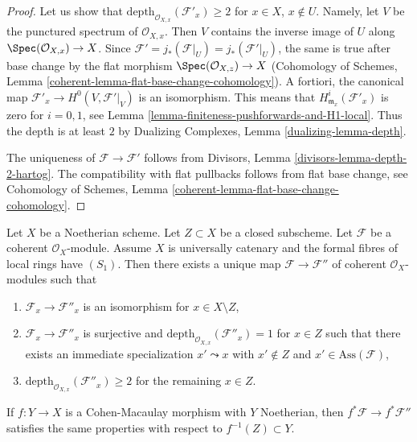 \begin{proof}
Let us show that $\text{depth}_{\mathcal{O}_{X, x}}(\mathcal{F}'_x) \geq 2$
for $x \in X$, $x \not \in U$. Namely, let $V$ be the punctured spectrum of
$\mathcal{O}_{X, x}$. Then $V$ contains the inverse image of
$U$ along $\Spec(\mathcal{O}_{X, x}) \to X$.
Since $\mathcal{F}' = j_*(\mathcal{F}|_U) =
j_*(\mathcal{F}'|_U)$, the same is true after
base change by the flat morphism $\Spec(\mathcal{O}_{X, z}) \to X$
(Cohomology of Schemes, Lemma
\ref{coherent-lemma-flat-base-change-cohomology}).
A fortiori, the canonical map
$\mathcal{F}'_x \to H^0(V, \mathcal{F}'|_V)$
is an isomorphism. This means that $H^i_{\mathfrak m_x}(\mathcal{F}'_x)$
is zero for $i = 0, 1$, see
Lemma \ref{lemma-finiteness-pushforwards-and-H1-local}.
Thus the depth is at least $2$ by
Dualizing Complexes, Lemma \ref{dualizing-lemma-depth}.

\medskip\noindent
The uniqueness of $\mathcal{F} \to \mathcal{F}'$ follows from
Divisors, Lemma \ref{divisors-lemma-depth-2-hartog}.
The compatibility with flat pullbacks follows from
flat base change, see Cohomology of Schemes, Lemma
\ref{coherent-lemma-flat-base-change-cohomology}.
\end{proof}

\begin{lemma}
\label{lemma-make-S2-along-Z}
Let $X$ be a Noetherian scheme. Let $Z \subset X$ be a closed subscheme.
Let $\mathcal{F}$ be a coherent $\mathcal{O}_X$-module. Assume
$X$ is universally catenary and the formal fibres of local rings have $(S_1)$.
Then there exists a unique map $\mathcal{F} \to \mathcal{F}''$
of coherent $\mathcal{O}_X$-modules such that
\begin{enumerate}
\item $\mathcal{F}_x \to \mathcal{F}''_x$
is an isomorphism for $x \in X \setminus Z$,
\item $\mathcal{F}_x \to \mathcal{F}''_x$ is surjective and
$\text{depth}_{\mathcal{O}_{X, x}}(\mathcal{F}''_x) = 1$
for $x \in Z$ such that there exists an immediate specialization
$x' \leadsto x$ with $x' \not \in Z$ and $x' \in \text{Ass}(\mathcal{F})$,
\item $\text{depth}_{\mathcal{O}_{X, x}}(\mathcal{F}''_x) \geq 2$
for the remaining $x \in Z$.
\end{enumerate}
If $f : Y \to X$ is a Cohen-Macaulay morphism with $Y$ Noetherian,
then $f^*\mathcal{F} \to f^*\mathcal{F}''$ satisfies the same properties
with respect to $f^{-1}(Z) \subset Y$.
\end{lemma}

